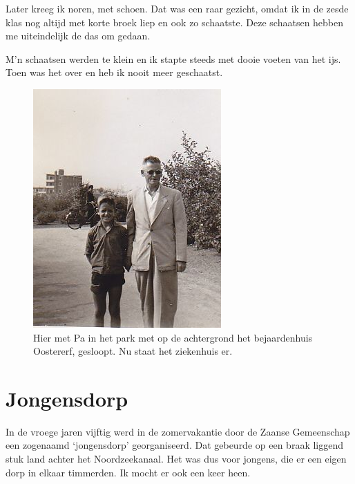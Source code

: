\documentclass[12pt,twoside, openright]{memoir}
\newlength{\drop}%
\begin{document}
Later kreeg ik noren, met schoen. Dat was een raar gezicht, omdat ik in de zesde klas nog altijd met korte broek liep en ook zo schaatste. Deze schaatsen hebben me uiteindelijk de das om gedaan. 

M’n schaatsen werden te klein en ik stapte steeds met dooie voeten van het ijs. Toen was het over en heb ik nooit meer geschaatst. 

\begin{figure}
\includegraphics[width=\textwidth]{img/ch13/metpa2}
\caption*{\footnotesize Hier met Pa in het park met op de achtergrond het bejaardenhuis Oostererf, gesloopt. Nu staat het ziekenhuis er.}
\end{figure}

\chapter{Jongensdorp} %
\label{cha:jongensdrop}

In de vroege jaren vijftig werd in de zomervakantie door de Zaanse Gemeenschap een zogenaamd `jongensdorp' georganiseerd. Dat gebeurde op een braak liggend stuk land achter het Noordzeekanaal. Het was dus voor jongens, die er een eigen dorp in elkaar timmerden. Ik mocht er ook een keer heen. 
\end{document}
